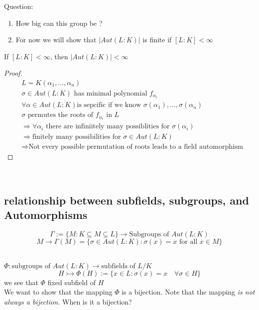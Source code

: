 \documentclass{article}
\begin{document}
Question: \begin{enumerate}
    \item How big can this group be ?
    \item For now we will show that $|Aut(L:K)|$ is finite if $[L : K] < \infty$
\end{enumerate}
\begin{theorem}
    If $[L:K] < \infty$, then $|Aut(L:K)| < \infty$
    \begin{proof}
        \leavevmode \\ 
        \begin{align*}
            &L = K(\alpha_1, \dots, \alpha_n) \\ 
            &\sigma \in Aut(L:K)  \text{ has minimal polynomial } f_{\alpha_i}\\
            &\forall \alpha \in Aut(L:K)  \text {is sepcific if we know } \sigma(\alpha_1), \dots, \sigma(\alpha_n) \\ 
            &\sigma \text{ permutes the roots of } f_{\alpha_i} \text{ in } L \\
            &\Rightarrow \forall \alpha_i \text{ there are infiniitely many possiblities for } \sigma(\alpha_i) \\
            &\Rightarrow \text{finitely many possibilities for } \sigma \in Aut(L:K) \\
            &\Rightarrow \text{Not every possible permutation of roots leads to a field automorphism}
        \end{align*}
    \end{proof}
    
\end{theorem}
 \hrulefill \\
\subsection{relationship between subfields, subgroups, and Automorphisms}

$$\Gamma := \{M : K \subseteq M \subseteq L\} \rightarrow \text{Subgroups of } Aut(L:K)$$
$$M \rightarrow \Gamma(M) = \{\sigma \in Aut(L:K) : \sigma(x) = x \text{ for all } x \in M\}$$

\hrulefill \\ 
$\Phi: \text{subgroups of } Aut(L:K) \to \text{subfields of } L/K$ \\ 
$$H \rightarrowtail \Phi(H):= \{x \in L : \sigma(x) = x \quad  \forall \sigma \in H\}$$
we see that $\Phi$ fixed subfield of $H$ \\ 
We want to show that the mapping $\Phi$ is a bijection. Note that the mapping \textit{ is not always a bijection.} When is it a bijection? \\ 
\end{document}
